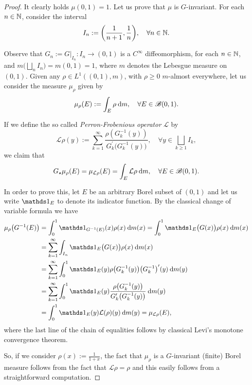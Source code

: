 \begin{proof}
  It clearly holds $\mu(0,1)=1$. Let us prove that $\mu$ is $G$-invariant. For each $n\in\mathbb{N}$, consider the interval
  \begin{displaymath}
    I_{n}:=\bigg(\frac{1}{n+1},\frac{1}{n}\bigg), \quad\forall n\in\mathbb{N}.
  \end{displaymath}

  Observe that $G_{n}:=G\big|_{I_{n}}\colon I_{n}\to (0,1)$ is a $C^{\infty}$ diffeomorphism, for each $n\in\mathbb{N}$, and $m\Big(\bigsqcup_{n} I_{n})=m(0,1)=1$, where $m$ denotes the Lebesgue measure on $(0,1)$. Given any $\rho\in L^{1}((0,1),m)$, with $\rho\geq 0$ $m$-almost everywhere, let us consider the measure $\mu_{\rho}$ given by
  \begin{displaymath}
    \mu_{\rho}(E):=\int_{E} \rho\:\mathrm{d} m, \quad\forall E\in \mathscr{B}(0,1).
  \end{displaymath}

  If we define the so called \emph{Perron-Frobenious operator} $\mathcal{L}$ by
  \begin{displaymath}
    \mathcal{L}\rho(y) :=\sum_{k=1}^{\infty}\frac{\rho(G_{k}^{-1}(y))}{G_{k}^{\prime}\big(G_{k}^{-1}(y)\big)}, \quad\forall y\in \bigsqcup_{k\geq 1} I_{k},
  \end{displaymath}
  we claim that
  \begin{displaymath}
    G_{\star}\mu_{\rho}(E) = \mu_{\mathcal{L}\rho}(E) = \int_{E} \mathcal{L}\rho\:\mathrm{d} m, \quad\forall E\in\mathscr{B}(0,1).
  \end{displaymath}

  In order to prove this, let $E$ be an arbitrary Borel subset of $(0,1)$ and let us write $\ds{1}_{E}$ to denote its indicator function. By the classical change of variable formula we have~
  \begin{displaymath}
    \begin{split}
      \mu_{\rho}\big(G^{-1}(E)\big) &=\int_{0}^{1}\ds{1}_{G^{-1}(E)}(x)\rho(x)\dd m(x) = \int_{0}^{1}\ds{1}_{E}\big(G(x)\big)\rho(x)\dd m(x) \\
                                    &=\sum_{k=1}^{\infty}\int_{I_{n}} \ds{1}_{E}\big(G(x)\big)\rho(x)\dd m(x) \\
                                    &= \sum_{k=1}^{\infty}\int_{0}^{1}\ds{1}_{E}(y)\rho\big(G_{k}^{-1}(y)\big) {\big(G_{k}^{-1}\big)}^{\prime}(y) \dd m(y) \\
                                    &= \sum_{k=1}^{\infty}\int_{0}^{1} \ds{1}_{E}(y) \frac{\rho\big(G_{k}^{-1}(y)\big)}{G_{k}^{\prime}\big(G_{k}^{-1}(y)\big)}\dd m(y) \\
                                    &= \int_{0}^{1}\ds{1}_{E}(y) \mathcal{L}(\rho)(y)\dd m(y) = \mu_{\mathcal{L}\rho}(E),
    \end{split}
  \end{displaymath}
  where the last line of the chain of equalities follows by classical Levi's monotone convergence theorem.

  So, if we consider $\rho(x):=\frac{1}{1+x}$, the fact that $\mu_{\rho}$ is a $G$-invariant (finite) Borel measure follows from the fact that $\mathcal{L}\rho=\rho$ and this easily follows from a straightforward computation.
\end{proof}

